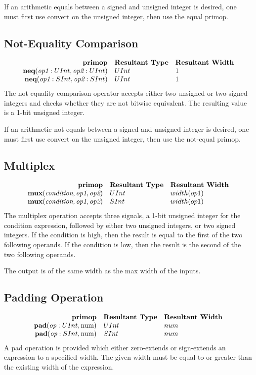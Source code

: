 \documentclass[10pt]{article}
\begin{document}
If an arithmetic equals between a signed and unsigned integer is desired, one must first use convert on the unsigned integer, then use the equal primop.

\subsection{Not-Equality Comparison}
\[
\begin{array}{rll}
\text{\bf primop} & \text{\bf Resultant Type} & \text{\bf Resultant Width} \\
\text{\bf neq}(\text{\em op1}:UInt, \text{\em op2}:UInt)     & UInt & 1 \\
\text{\bf neq}(\text{\em op1}:SInt, \text{\em op2}:SInt)     & UInt & 1 \\
\end{array}
\]
The not-equality comparison operator accepts either two unsigned or two signed integers and checks whether they are not bitwise equivalent.
The resulting value is a 1-bit unsigned integer. 

If an arithmetic not-equals between a signed and unsigned integer is desired, one must first use convert on the unsigned integer, then use the not-equal primop.

\subsection{Multiplex}
\[
\begin{array}{rll}
\text{\bf primop} & \text{\bf Resultant Type} & \text{\bf Resultant Width} \\
\text{\bf mux}  (\text{\em condition}, \text{\em op1}, \text{\em op2}) & UInt & width(op1) \\
\text{\bf mux}  (\text{\em condition}, \text{\em op1}, \text{\em op2}) & SInt & width(op1) \\
\end{array}
\]
The multiplex operation accepts three signals, a 1-bit unsigned integer for the condition expression, followed by either two unsigned integers, or two signed integers.
If the condition is high, then the result is equal to the first of the two following operands.
If the condition is low, then the result is the second of the two following operands. 

The output is of the same width as the max width of the inputs.

\subsection{Padding Operation}
\[
\begin{array}{rll}
\text{\bf primop} & \text{\bf Resultant Type} & \text{\bf Resultant Width} \\
\text{\bf pad}(\text{\em op}:UInt, \text{num})     & UInt & num \\
\text{\bf pad}(\text{\em op}:SInt, \text{num})     & SInt & num \\
\end{array}
\]
A pad operation is provided which either zero-extends or sign-extends an expression to a specified width.
The given width must be equal to or greater than the existing width of the expression. 
\end{document}
